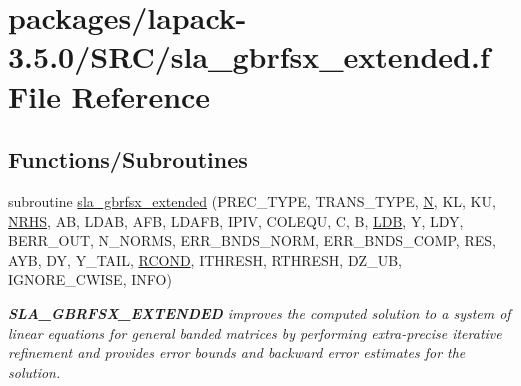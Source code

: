 \hypertarget{sla__gbrfsx__extended_8f}{}\section{packages/lapack-\/3.5.0/\+S\+R\+C/sla\+\_\+gbrfsx\+\_\+extended.f File Reference}
\label{sla__gbrfsx__extended_8f}
\subsection*{Functions/\+Subroutines}
\begin{DoxyCompactItemize}
\item 
subroutine \hyperlink{group__realGBcomputational_ga5ce5ba6e2efc6f91b09cb066ec7d0eed}{sla\+\_\+gbrfsx\+\_\+extended} (P\+R\+E\+C\+\_\+\+T\+Y\+P\+E, T\+R\+A\+N\+S\+\_\+\+T\+Y\+P\+E, \hyperlink{polmisc_8c_a0240ac851181b84ac374872dc5434ee4}{N}, K\+L, K\+U, \hyperlink{example__user_8c_aa0138da002ce2a90360df2f521eb3198}{N\+R\+H\+S}, A\+B, L\+D\+A\+B, A\+F\+B, L\+D\+A\+F\+B, I\+P\+I\+V, C\+O\+L\+E\+Q\+U, C, B, \hyperlink{example__user_8c_a50e90a7104df172b5a89a06c47fcca04}{L\+D\+B}, Y, L\+D\+Y, B\+E\+R\+R\+\_\+\+O\+U\+T, N\+\_\+\+N\+O\+R\+M\+S, E\+R\+R\+\_\+\+B\+N\+D\+S\+\_\+\+N\+O\+R\+M, E\+R\+R\+\_\+\+B\+N\+D\+S\+\_\+\+C\+O\+M\+P, R\+E\+S, A\+Y\+B, D\+Y, Y\+\_\+\+T\+A\+I\+L, \hyperlink{superlu__enum__consts_8h_af00a42ecad444bbda75cde1b64bd7e72a9b5c151728d8512307565994c89919d5}{R\+C\+O\+N\+D}, I\+T\+H\+R\+E\+S\+H, R\+T\+H\+R\+E\+S\+H, D\+Z\+\_\+\+U\+B, I\+G\+N\+O\+R\+E\+\_\+\+C\+W\+I\+S\+E, I\+N\+F\+O)
\begin{DoxyCompactList}\small\item\em {\bfseries S\+L\+A\+\_\+\+G\+B\+R\+F\+S\+X\+\_\+\+E\+X\+T\+E\+N\+D\+E\+D} improves the computed solution to a system of linear equations for general banded matrices by performing extra-\/precise iterative refinement and provides error bounds and backward error estimates for the solution. \end{DoxyCompactList}\end{DoxyCompactItemize}
